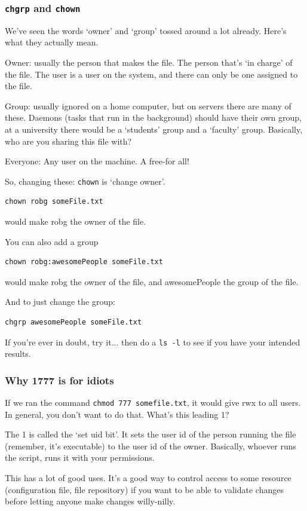 \subsubsection{{\tt chgrp} and {\tt chown}}
We've seen the words `owner' and `group' tossed around a lot already. Here's what they 
actually mean.

Owner: usually the person that makes the file. The person that's `in charge' of the file. The user
is a user on the system, and there can only be one assigned to the file.

Group: usually ignored on a home computer, but on servers there are many of these. Daemons (tasks that run
in the background) should have their own group, at a university there would be a `students' group and a `faculty' group. 
Basically, who are you sharing this file with?

Everyone: Any user on the machine. A free-for all!

So, changing these: {\tt chown} is `change owner'. 
\begin{verbatim}chown robg someFile.txt \end{verbatim}
would make robg the owner of the file.

You can also add a group
\begin{verbatim}chown robg:awesomePeople someFile.txt \end{verbatim}
would make robg the owner of the file, and awesomePeople the group of the file.

And to just change the group:
\begin{verbatim}chgrp awesomePeople someFile.txt \end{verbatim}
	
If you're ever in doubt, try it... then do a {\tt ls -l} to see if you have your intended results.

\subsubsection{Why 1777 is for idiots}

If we ran the command {\tt chmod 777 somefile.txt}, it would give rwx to all users. In general, you don't
want to do that. What's this leading 1?

The 1 is called the `set uid bit'. It sets the user id of the person running the file (remember, it's executable) to the
user id of the owner. Basically, whoever runs the script, runs it with your permissions.

This has a lot of good uses. It's a good way to control access to some resource (configuration file, file repository) if you want
to be able to validate changes before letting anyone make changes willy-nilly. 

